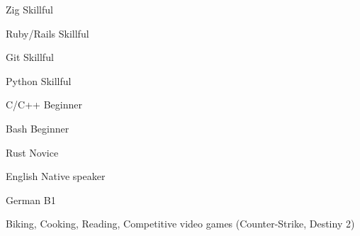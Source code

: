 \documentclass[11pt, a4paper]{awesome-cv}
\begin{document}
\begin{cvskills}

  \cvskill
    {Zig} %
    {Skillful} %

  \cvskill
    {Ruby/Rails} %
    {Skillful} %

  \cvskill
    {Git} %
    {Skillful} %

  \cvskill
    {Python} %
    {Skillful} %

  \cvskill
    {C/C++} %
    {Beginner} %

  \cvskill
    {Bash} %
    {Beginner} %

  \cvskill
    {Rust} %
    {Novice} %

\end{cvskills}


\begin{cvskills}

  \cvskill
    {English} %
    {Native speaker} %

  \cvskill
    {German} %
    {B1} %

\end{cvskills}


\begin{cvparagraph}
Biking, Cooking, Reading, Competitive video games (Counter-Strike, Destiny 2)
\end{cvparagraph}

\end{document}
